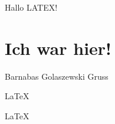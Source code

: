 \documentclass{article}
\begin{document}
Hallo LATEX!  

\section{Ich war hier!}
Barnabas Golaszewski
Gruss

\LaTeX 

\huge
\LaTeX 
   
\end{document}
